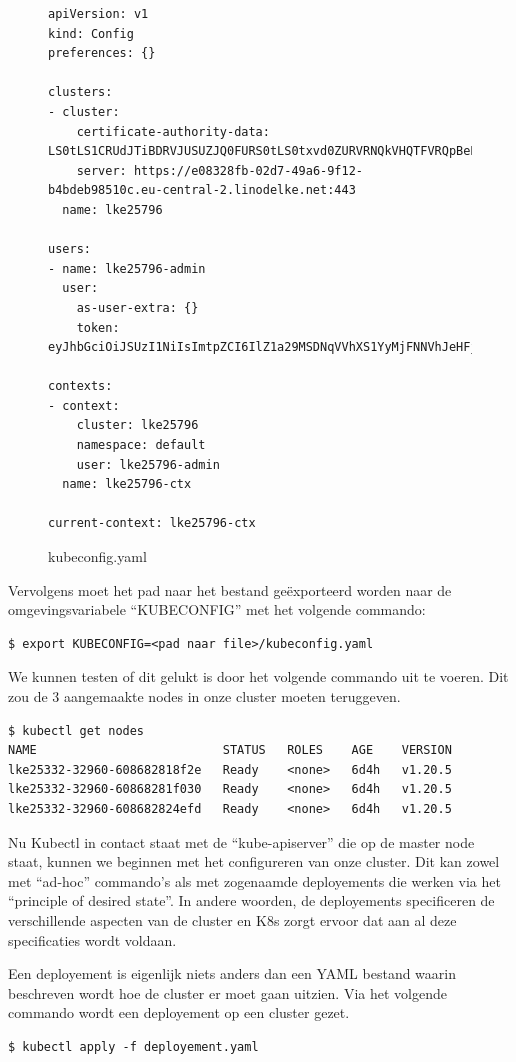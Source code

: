 \begin{figure}[ht] \label{kubeconfig}
	\begin{verbatim}
apiVersion: v1
kind: Config
preferences: {}

clusters:
- cluster:
    certificate-authority-data: LS0tLS1CRUdJTiBDRVJUSUZJQ0FURS0tLS0txvd0ZURVRNQkVHQTFVRQpBeE1LYTNWaVpYSnVaWFJsY3pDQ0FTSXdEUVlKS29aSWh2Y05BUUVCQlFBRGdnRVBBRENDQVFvQ2dn
    server: https://e08328fb-02d7-49a6-9f12-b4bdeb98510c.eu-central-2.linodelke.net:443
  name: lke25796

users:
- name: lke25796-admin
  user:
    as-user-extra: {}
    token: eyJhbGciOiJSUzI1NiIsImtpZCI6IlZ1a29MSDNqVVhXS1YyMjFNNVhJeHFjTFNXaXhwYVhNT3FWb2NjTWFOV2MifQ.eyJpc3MiOiJrdWJlcm5ldGVzL3NlcnZpY2VhY2NvdW50Iiwia3ViZ

contexts:
- context:
    cluster: lke25796
    namespace: default
    user: lke25796-admin
  name: lke25796-ctx

current-context: lke25796-ctx
	\end{verbatim}
		\caption{kubeconfig.yaml}
\end{figure}

Vervolgens moet het pad naar het bestand geëxporteerd worden naar de omgevingsvariabele ``KUBECONFIG'' met het volgende commando:
\begin{verbatim}
$ export KUBECONFIG=<pad naar file>/kubeconfig.yaml
\end{verbatim}

We kunnen testen of dit gelukt is door het volgende commando uit te voeren. Dit zou de 3 aangemaakte nodes in onze cluster moeten teruggeven.
\begin{verbatim}
$ kubectl get nodes
NAME                          STATUS   ROLES    AGE    VERSION
lke25332-32960-608682818f2e   Ready    <none>   6d4h   v1.20.5
lke25332-32960-60868281f030   Ready    <none>   6d4h   v1.20.5
lke25332-32960-608682824efd   Ready    <none>   6d4h   v1.20.5
\end{verbatim}


Nu Kubectl in contact staat met de ``kube-apiserver'' die op de master node staat, kunnen we beginnen met het configureren van onze cluster. Dit kan zowel met ``ad-hoc'' commando's als met zogenaamde deployements die werken via het ``principle of desired state''. In andere woorden, de deployements specificeren de verschillende aspecten van de cluster en K8s zorgt ervoor dat aan al deze specificaties wordt voldaan.

Een deployement is eigenlijk niets anders dan een YAML bestand waarin beschreven wordt hoe de cluster er moet gaan uitzien. Via het volgende commando wordt een deployement op een cluster gezet.
\begin{verbatim}
$ kubectl apply -f deployement.yaml
\end{verbatim}


